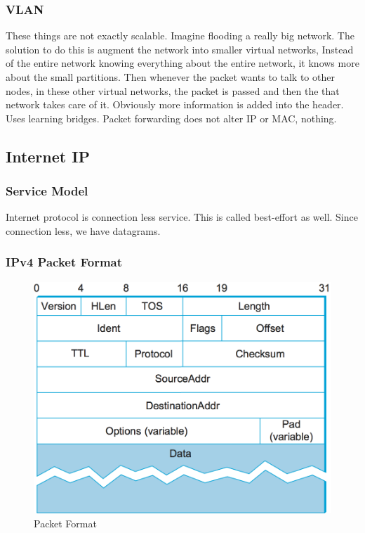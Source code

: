 \documentclass[11pt, a4paper]{article}
\begin{document}
\subsubsection{VLAN}
These things are not exactly scalable. Imagine flooding a really big network. The solution to do this is augment the network into smaller virtual networks, Instead of the entire network knowing everything about the entire network, it knows more about the small partitions. Then whenever the packet wants to talk to other nodes, in these other virtual networks, the packet is passed and then the that network takes care of it. Obviously more information is added into the header. Uses learning bridges. Packet forwarding does not alter IP or MAC, nothing.

\subsection{Internet IP}
\subsubsection{Service Model}
Internet protocol is connection less service. This is called best-effort as well. Since connection less, we have datagrams.

\subsubsection{IPv4 Packet Format}
\begin{figure}[H]
    \centering
    \includegraphics[width = \textwidth]{Pictures/ipv4.png}
    \caption{Packet Format}
    \label{fig:my_label}
\end{figure}
\end{document}
